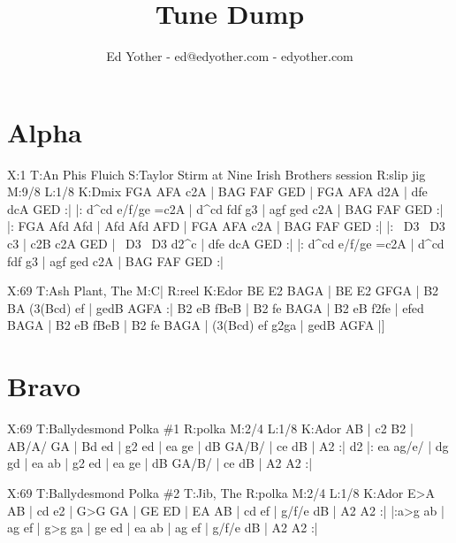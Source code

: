 \documentclass{article}
\title{Tune Dump}
\author{Ed Yother - ed@edyother.com - edyother.com}
\begin{document}
\maketitle

\tableofcontents

\section{Alpha}

\begin{abc}[name]
X:1
T:An Phis Fluich
S:Taylor Stirm at Nine Irish Brothers session
R:slip jig
M:9/8
L:1/8
K:Dmix
FGA AFA c2A | BAG FAF GED | FGA AFA d2A | dfe dcA GED :|
|: d^cd e/f/ge =c2A | d^cd fdf g3 | agf ged c2A | BAG FAF GED :|
|: FGA Afd Afd | Afd Afd AFD | FGA AFA c2A | BAG FAF GED :|
|: ~D3 ~D3 c3 | c2B c2A GED | ~D3 ~D3 d2^c | dfe dcA GED :|
|: d^cd e/f/ge =c2A | d^cd fdf g3 | agf ged c2A | BAG FAF GED :|
\end{abc}

\begin{abc}[name]
X:69
T:Ash Plant, The
M:C|
R:reel
K:Edor
BE E2 BAGA | BE E2 GFGA | B2 BA (3(Bcd) ef | gedB AGFA :|
B2 eB fBeB | B2 fe BAGA | B2 eB f2fe | efed BAGA |
B2 eB fBeB | B2 fe BAGA | (3(Bcd) ef g2ga | gedB AGFA |]
\end{abc}

\section{Bravo}

\begin{abc}[name]
X:69
T:Ballydesmond Polka \#1
R:polka
M:2/4
L:1/8
K:Ador
AB | c2 B2 | AB/A/ GA | Bd ed | g2 ed |
ea ge | dB GA/B/ | ce dB | A2 :|
d2 |: ea ag/e/ | dg gd | ea ab | g2 ed |
ea ge | dB GA/B/ | ce dB | A2 A2 :|
\end{abc}

\begin{abc}[name]
X:69
T:Ballydesmond Polka \#2
T:Jib, The
R:polka
M:2/4
L:1/8
K:Ador
E>A AB | cd e2 | G>G GA | GE ED |
EA AB | cd ef | g/f/e dB | A2 A2 :|
|:a>g ab | ag ef | g>g ga | ge ed |
ea ab | ag ef | g/f/e dB | A2 A2 :|
\end{abc}
\end{document}
